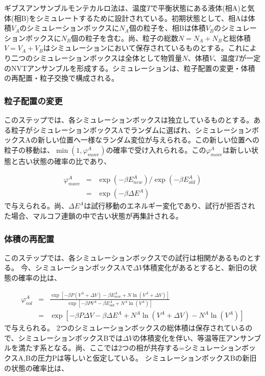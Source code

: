\documentclass[titlepage]{jsreport}
\begin{document}
ギブスアンサンブルモンテカルロ法は、温度$T$で平衡状態にある液体(相A)と気体(相B)をシミュレートするために設計されている\cite{gibbs-ensemble-panagiotopoulos-2}。初期状態として、相Aは体積$V_A$のシミュレーションボックスに$N_A$個の粒子を、相Bは体積$V_B$のシミュレーションボックスに$N_B$個の粒子を含む。尚、粒子の総数$N=N_A+N_B$と総体積$V=V_A+V_B$はシミュレーションにおいて保存されているものとする。これにより二つのシミュレーションボックスは全体として物質量$N$、体積$V$、温度$T$が一定のNVTアンサンブルを形成する。シミュレーションは、粒子配置の変更・体積の再配置・粒子交換で構成される。

\subsubsection{粒子配置の変更}\label{principle-subsubsec:particle-displacement}
このステップでは、各シミュレーションボックスは独立しているものとする。ある粒子がシミュレーションボックスAでランダムに選ばれ、シミュレーションボックスAの新しい位置へ一様なランダム変位が与えられる。この新しい位置への粒子の移動は、$\min(1, \varphi_{move}^A)$の確率で受け入れられる。この$\varphi_{move}^A$は新しい状態と古い状態の確率の比であり、

\large
\begin{eqnarray}
\varphi_{move}^A &=& \exp(-{\beta}E_{new}^A)/\exp(-{\beta}E_{old}^A) \nonumber\\
                 &=& \exp(-{\beta}{\Delta}E^A)\label{eq:particle-displacement-probability}
\end{eqnarray}
\normalsize
で与えられる。尚、${\Delta}E^A$は試行移動のエネルギー変化であり、試行が拒否された場合、マルコフ連鎖の中で古い状態が再集計される。

\subsubsection{体積の再配置}\label{principle-subsubsec:volume-rearrangement}
このステップでは、各シミュレーションボックスでの試行は相関があるものとする。
今、シミュレーションボックスAで$\Delta{V}$体積変化があるとすると、新旧の状態の確率の比は、

\large
\begin{eqnarray}
\varphi_{vol}^A &=& \frac{\exp[-{\beta}P(V^A+{\Delta}V)-{\beta}E^A_{new}+N\ln(V^A+{\Delta}V)]}{\exp[-{\beta}PV^A-{\beta}E^A_{old}+N^A\ln(V^A)]} \nonumber\\
                &=& \exp[-{\beta}P{\Delta}V-{\beta}{\Delta}E^A+N^A\ln(V^A+{\Delta}V)-N^A\ln(V^A)]\label{eq:volume-rearrangement-probability-A}
\end{eqnarray}
\normalsize
で与えられる。
2つのシミュレーションボックスの総体積は保存されているので、シミュレーションボックスBでは${\Delta}V$の体積変化を伴い、等温等圧アンサンブルを満たす系となる。尚、ここでは2つの相が共存する=シミュレーションボックスA,Bの圧力Pは等しいと仮定している。
シミュレーションボックスBの新旧の状態の確率比は、
\end{document}
